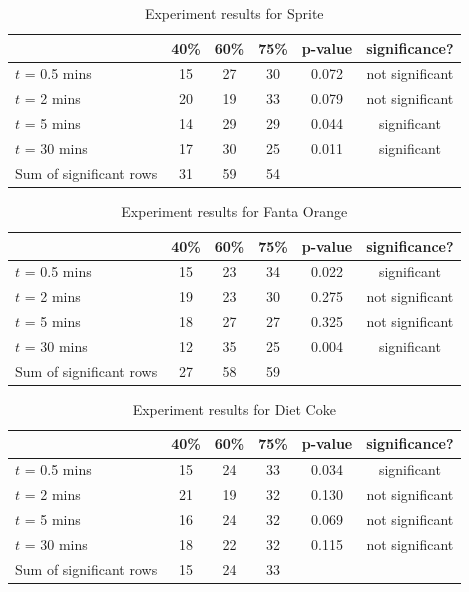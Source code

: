 \documentclass[oneside,12pt]{report}
\begin{document}
\begin{table}[ h]
\centering
\begin{tabular}{ l || c|c|c||c|c }
  &40\% &60\% & 75\% &p-value &significance? \\
\hline  
$t$ = 0.5 mins & 15 & 27 & 30&0.072&not significant\\ 
\hline  
$t$ = 2 mins & 20 & 19 & 33&0.079&not significant\\ 
\hline  
$t$ = 5 mins & 14 & 29 & 29&0.044&significant\\ 
\hline  
$t$ = 30 mins & 17 & 30 & 25&0.011&significant\\ 
\hline  
Sum of significant rows & 31 & 59 & 54 & & \\ 
\hline     

 \end{tabular}
\caption{Experiment results for Sprite}
\label{Sprite}
\end{table}

\begin{table}[ h]
\centering
\begin{tabular}{ l || c|c|c||c|c }
  &40\% &60\% & 75\% &p-value &significance? \\
\hline  
$t$ = 0.5 mins & 15 & 23 & 34&0.022&significant\\ 
\hline  
$t$ = 2 mins & 19 & 23 & 30&0.275&not significant\\ 
\hline  
$t$ = 5 mins & 18 & 27 & 27&0.325&not significant\\ 
\hline  
$t$ = 30 mins & 12 & 35 & 25&0.004&significant\\ 
\hline     
Sum of significant rows & 27 & 58 & 59 & & \\ 
\hline     
 \end{tabular}
\caption{Experiment results for Fanta Orange}
\label{FantaOrange}
\end{table}

\begin{table}[ h]
\centering
\begin{tabular}{ l || c|c|c||c|c }
  &40\% &60\% & 75\% &p-value &significance? \\
\hline  
$t$ = 0.5 mins & 15 & 24 & 33&0.034&significant\\ 
\hline  
$t$ = 2 mins & 21& 19 & 32&0.130 &not significant\\ 
\hline  
$t$ = 5 mins & 16 & 24 & 32&0.069&not significant\\ 
\hline  
$t$ = 30 mins & 18 & 22& 32&0.115&not significant\\ 
\hline  
Sum of significant rows & 15 & 24 & 33 & & \\ 
\hline     
 \end{tabular}
\caption{Experiment results for Diet Coke}
\label{DietCoke}
\end{table}
\end{document}
